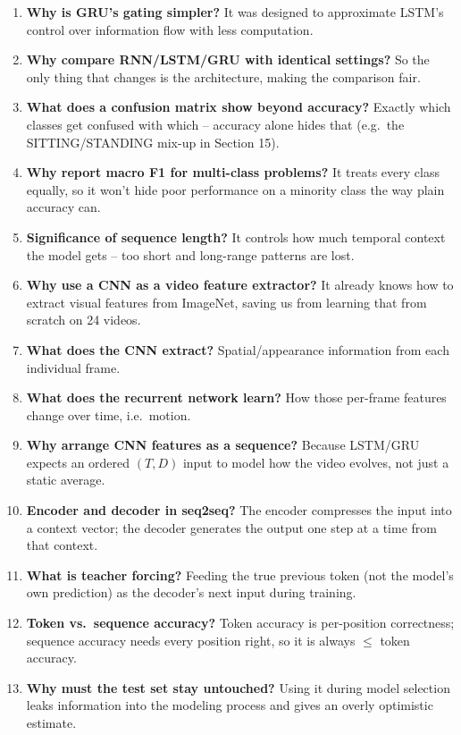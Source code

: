 \documentclass[10pt]{article}
\begin{document}
\begin{enumerate}
\item \textbf{Why is GRU's gating simpler?} It was designed to approximate LSTM's control over information flow with less computation.
\item \textbf{Why compare RNN/LSTM/GRU with identical settings?} So the only thing that changes is the architecture, making the comparison fair.
\item \textbf{What does a confusion matrix show beyond accuracy?} Exactly which classes get confused with which -- accuracy alone hides that (e.g.\ the SITTING/STANDING mix-up in Section 15).
\item \textbf{Why report macro F1 for multi-class problems?} It treats every class equally, so it won't hide poor performance on a minority class the way plain accuracy can.
\item \textbf{Significance of sequence length?} It controls how much temporal context the model gets -- too short and long-range patterns are lost.
\item \textbf{Why use a CNN as a video feature extractor?} It already knows how to extract visual features from ImageNet, saving us from learning that from scratch on 24 videos.
\item \textbf{What does the CNN extract?} Spatial/appearance information from each individual frame.
\item \textbf{What does the recurrent network learn?} How those per-frame features change over time, i.e.\ motion.
\item \textbf{Why arrange CNN features as a sequence?} Because LSTM/GRU expects an ordered $(T,D)$ input to model how the video evolves, not just a static average.
\item \textbf{Encoder and decoder in seq2seq?} The encoder compresses the input into a context vector; the decoder generates the output one step at a time from that context.
\item \textbf{What is teacher forcing?} Feeding the true previous token (not the model's own prediction) as the decoder's next input during training.
\item \textbf{Token vs.\ sequence accuracy?} Token accuracy is per-position correctness; sequence accuracy needs every position right, so it is always $\le$ token accuracy.
\item \textbf{Why must the test set stay untouched?} Using it during model selection leaks information into the modeling process and gives an overly optimistic estimate.
\end{enumerate}
\end{document}
